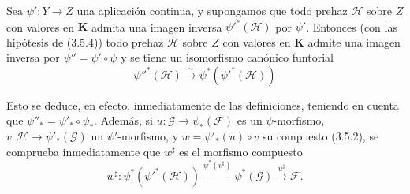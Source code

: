 \begin{env}[3.5.5]
\label{0.3.5.5-fr}
Sea $\psi':Y\to Z$ una aplicación continua, y supongamos que todo
prehaz $\mathcal{H}$ sobre $Z$ con valores en $\boldsymbol{K}$ admita una
imagen inversa $\psi'^*(\mathcal{H})$ por $\psi'$. Entonces (con las
hipótesis de (3.5.4)) todo prehaz $\mathcal{H}$ sobre $Z$ con valores en
$\boldsymbol{K}$ admite una imagen inversa por $\psi''=\psi'\circ\psi$ y se tiene
un isomorfismo canónico funtorial
\begin{equation*}
  \psi''^*(\mathcal{H})\xrightarrow{\sim}
  \psi^*(\psi'^*(\mathcal{H}))
\tag{3.5.5.1}\label{0.3.5.5.1-fr}
\end{equation*}


Esto se deduce, en efecto, inmediatamente de las definiciones, teniendo en cuenta que
$\psi''_*=\psi'_*\circ\psi_*$. Además, si
$u:\mathcal{G}\to\psi_*(\mathcal{F})$ es un $\psi$-morfismo,
$v:\mathcal{H}\to\psi'_*(\mathcal{G})$ un $\psi'$-morfismo, y
$w=\psi'_*(u)\circ v$ su compuesto (3.5.2), se comprueba inmediatamente que
$w^\sharp$ es el morfismo compuesto
\[
  w^\sharp:\psi^*(\psi'^*(\mathcal{H}))
  \xrightarrow{\psi^*(v^\sharp)}
  \psi^*(\mathcal{G})
  \xrightarrow{u^\sharp}\mathcal{F}.
\]
\end{env}
